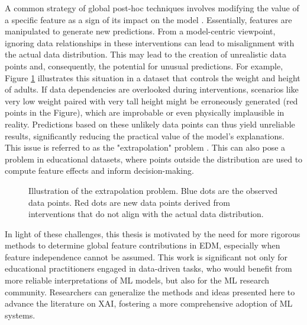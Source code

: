 A common strategy of global post-hoc techniques involves modifying the value of a specific feature as a sign of its impact on the model \cite{Scholbeck2020SamplingInterpretations}. Essentially, features are manipulated to generate new predictions. From a model-centric viewpoint, ignoring data relationships in these interventions can lead to misalignment with the actual data distribution. This may lead to the creation of unrealistic data points and, consequently, the potential for unusual predictions. For example, Figure \ref{fig:extrapolation_introduction} illustrates this situation in a dataset that controls the weight and height of adults.  If data dependencies are overlooked during interventions, scenarios like very low weight paired with very tall height might be erroneously generated (red points in the Figure), which are improbable or even physically implausible in reality. Predictions based on these unlikely data points can thus yield unreliable results, significantly reducing the practical value of the model's explanations. This issue is referred to as the "extrapolation" problem \cite{Molnar2022GeneralModels, Rudin2019StopInstead}. This can also pose a problem in educational datasets, where points outside the distribution are used to compute feature effects and inform decision-making. 

\begin{figure}[ht!]
\centering
  \caption{Illustration of the extrapolation problem. Blue dots are the observed data points. Red dots are new data points derived from interventions that do not align with the actual data distribution.}
    \label{fig:extrapolation_introduction}
\end{figure}

 
In light of these challenges, this thesis is motivated by the need for more rigorous methods to determine global feature contributions in \gls{EDM}, especially when feature independence cannot be assumed. This work is significant not only for educational practitioners engaged in data-driven tasks, who would benefit from more reliable interpretations of \gls{ML} models, but also for the ML research community. Researchers can generalize the methods and ideas presented here to advance the literature on \gls{XAI}, fostering a more comprehensive adoption of ML systems.

